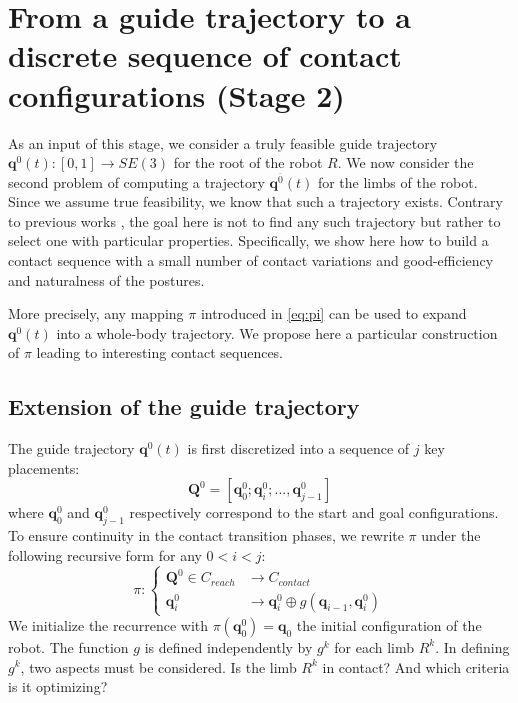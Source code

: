 \section{From a guide trajectory to a discrete sequence of contact configurations (Stage 2)}
\label{sec:efort}
As an input of this stage, we consider a truly feasible guide trajectory $\mathbf{q}^0(t) : [0,1] \longrightarrow SE(3)$ for the root of the robot $R$. We now consider the second problem of computing a trajectory $\mathbf{q}^{\overline{0}}(t)$ for the limbs of the robot. Since we assume true feasibility, we know that such a trajectory exists. Contrary to previous works \cite{DBLP:conf/iser/EscandeKMG08,Bouyarmane2009}, the goal here is not to find any such trajectory but rather to select one with particular properties. Specifically, we show here how to build a contact sequence with a small number of contact variations and  good-efficiency and naturalness of the postures. 

More precisely, any mapping $\pi$ introduced in \eqref{eq:pi} can be used to expand $\mathbf{q}^0(t)$ into a whole-body trajectory. We propose here a particular construction of $\pi$ leading to interesting contact sequences.


\subsection{Extension of the guide trajectory} 
The guide trajectory $\mathbf{q}^0(t)$ is first discretized into a sequence of $j$ key placements:  
\begin{equation*}
	\mathbf{Q}^0 = [\mathbf{q}^0_{0}; \mathbf{q}^0_{i}; ..., \mathbf{q}^0_{j-1}]
\end{equation*} 
where $\mathbf{q}^0_{0}$ and $\mathbf{q}^0_{j-1}$ respectively correspond to the start and goal configurations.  To ensure continuity in the contact transition phases, we rewrite $\pi$ under the following recursive form for any $0<i<j$:
\begin{equation*}
    \pi\colon\left\{
    \begin{aligned}		
        \mathbf{Q}^0 \in C_{reach} & \longrightarrow C_{contact} \\
        \mathbf{q}^{0}_i &  \longrightarrow  \mathbf{q}^{0}_i \oplus g(\mathbf{q}_{i - 1},\mathbf{q}^{0}_i) 
    \end{aligned}
    \right.
\end{equation*} 
We initialize the recurrence with $\pi(\mathbf{q}^0_{0}) = \mathbf{q}_0$ the initial configuration of the robot.
The function $g$ is defined independently by $g^k$ for each limb $R^k$. In defining $g^k$, two aspects must be considered. Is the limb $R^k$ in contact? And which criteria is it optimizing? 

